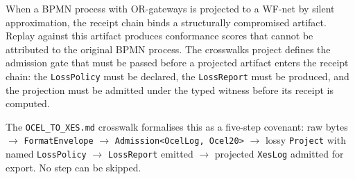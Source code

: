 When a \textsc{BPMN} process with \textsc{OR}-gateways is projected to a WF-net by silent
approximation, the receipt chain binds a structurally compromised artifact. Replay against this
artifact produces conformance scores that cannot be attributed to the original \textsc{BPMN}
process. The crosswalks project defines the admission gate that must be passed before a projected
artifact enters the receipt chain: the \texttt{LossPolicy} must be declared, the \texttt{LossReport}
must be produced, and the projection must be admitted under the typed witness before its receipt
is computed.

The \texttt{OCEL\_TO\_XES.md} crosswalk formalises this as a five-step covenant: raw bytes
\(\to\) \texttt{FormatEnvelope} \(\to\) \texttt{Admission<OcelLog, Ocel20>} \(\to\) lossy
\texttt{Project} with named \texttt{LossPolicy} \(\to\) \texttt{LossReport} emitted \(\to\)
projected \texttt{XesLog} admitted for export. No step can be skipped.

